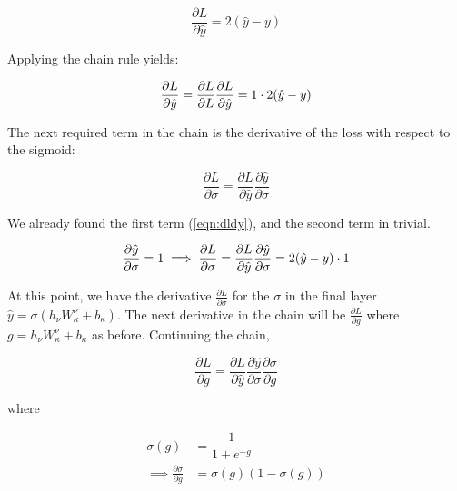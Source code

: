 \begin{equation}
\frac{\partial L}{\partial \hat{y}} = 2(\hat{y} - y )
\end{equation}

Applying the chain rule yields:

\begin{equation}
\label{eqn:dldy}
\frac{\partial L}{\partial \hat{y}} = \frac{\partial L}{\partial L}\frac{\partial L}{\partial \hat{y}} \\
= 1 \cdot 2(\hat{y} - y )
\end{equation}

The next required term in the chain is the derivative of the loss with respect to the sigmoid:

\begin{equation}
\frac{\partial L}{\partial \sigma} = \frac{\partial L}{\partial \hat{y}} \frac{\partial \hat{y}}{\partial \sigma}
\end{equation}

\noindent We already found the first term (\ref{eqn:dldy}), and the second term in trivial.

\begin{equation}
    \frac{\partial \hat{y}}{\partial \sigma} = 1 \\
    \implies \frac{\partial L}{\partial \sigma} =  \frac    {\partial L}{\partial \hat{y}} \frac{\partial \hat{y}}  {\partial \sigma} \\
    = 2(\hat{y} - y ) \cdot 1
\end{equation}

\noindent At this point, we have the derivative $ \frac{\partial L}{\partial \sigma} $ for the $ \sigma $ in the final layer $ \hat{y} = \sigma \left( h_\nu W_\kappa ^\nu + b_\kappa \right) $. The next derivative in the chain will be $ \frac{\partial L}{\partial g} $ where $ g = h_\nu W_\kappa ^\nu + b_\kappa $ as before. Continuing the chain,

\begin{equation}
\frac{\partial L}{\partial g} = \frac{\partial L}{\partial \hat{y}} \frac{\partial \hat{y}}{\partial \sigma} \frac{\partial \sigma}{\partial g}
\end{equation}

\noindent where

\begin{align}
\sigma(g) &= \dfrac{1}{1 + e^{-g}} \\
\implies \frac{\partial \sigma}{\partial g} &= \sigma(g)(1 - \sigma(g))
\end{align}

